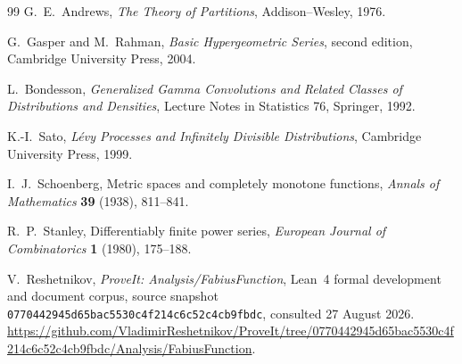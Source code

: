 \documentclass[11pt,oneside]{article}
\theoremstyle{definition}
\theoremstyle{remark}
\newcommand{\CommitID}{\texttt{0770442945d65bac5530\allowbreak c4f214c6c52c4cb9fbdc}}
\begin{document}
\begin{thebibliography}{99}
G.~E.~Andrews,
\newblock \emph{The Theory of Partitions},
\newblock Addison--Wesley, 1976.

G.~Gasper and M.~Rahman,
\newblock \emph{Basic Hypergeometric Series}, second edition,
\newblock Cambridge University Press, 2004.

L.~Bondesson,
\newblock \emph{Generalized Gamma Convolutions and Related Classes of Distributions and
Densities},
\newblock Lecture Notes in Statistics 76, Springer, 1992.

K.-I.~Sato,
\newblock \emph{L\'evy Processes and Infinitely Divisible Distributions},
\newblock Cambridge University Press, 1999.

I.~J.~Schoenberg,
\newblock Metric spaces and completely monotone functions,
\newblock \emph{Annals of Mathematics} \textbf{39} (1938), 811--841.

R.~P.~Stanley,
\newblock Differentiably finite power series,
\newblock \emph{European Journal of Combinatorics} \textbf{1} (1980), 175--188.

V.~Reshetnikov,
\newblock \emph{ProveIt: Analysis/FabiusFunction},
\newblock Lean~4 formal development and document corpus, source snapshot
\CommitID, consulted 27 August 2026.
\newblock \url{https://github.com/VladimirReshetnikov/ProveIt/tree/0770442945d65bac5530c4f214c6c52c4cb9fbdc/Analysis/FabiusFunction}.

\end{thebibliography}
\end{document}
